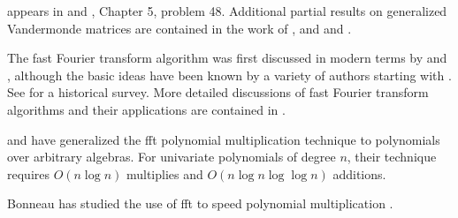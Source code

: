 \small

  appears
in {\Polya} and {\Szego} \cite{Polya1978-hx}, Chapter 5, problem 48.
Additional partial results on generalized Vandermonde matrices are
contained in the work of {\MitchellO} \cite{Mitchell1881-cv}, and
{\EvansR} and {\Isaacs} \cite{Evans1976-dq}.

The fast Fourier transform algorithm was first discussed in modern
terms by {\Cooley} and {\Tukey} \cite{Cooley1965-bp}, although the basic
ideas have been known by a variety of authors starting with {\Gauss}.
See \cite{Heideman1984-zr} for a historical survey.  More detailed
discussions of fast Fourier transform algorithms and their
applications are contained in 
\cite{Tolimieri1989-sz,Brigham1988-dw,Van_Loan1992-cb,Pollard1971-qy}.

{\CantorD} and {\Kaltofen} \cite{Cantor1991-rr} have generalized the {\sc fft}
polynomial multiplication technique to polynomials over arbitrary
algebras.  For univariate polynomials of degree $n$, their technique
requires $O(n \log n)$ multiplies and $O(n \log n \log \log n)$
additions.

Bonneau has studied the use of {\sc fft} to speed polynomial
multiplication
\cite{Bonneau1974-if}.

\normalsize
